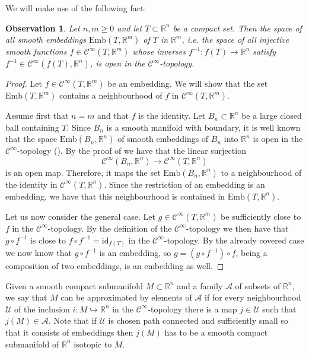 \documentclass{amsart}
\theoremstyle{plain}
\newtheorem{obs}[thm]{Observation}
\theoremstyle{definition}
\theoremstyle{remark}
\numberwithin{equation}{thm} %
\newcommand{\R}{\mathbb{R}}
\newcommand{\id}{\mathrm{id}}
\newcommand{\Emb}{\mathrm{Emb}}
\begin{document}
We will make use of the following fact:
\begin{obs}
Let $n,m\geq 0$ and let $T\subset \R^n$ be a compact set. Then the space of all smooth embeddings $\Emb(T,\R^m)$ of $T$ in $\R^m$, i.e. the space of all injective smooth functions $f\in \mathcal C^\infty(T,\R^m)$ whose inverses $f^{-1}:f(T)\rightarrow \R^n$ satisfy $f^{-1}\in \mathcal C^\infty(f(T),\R^n)$, is open in the $\mathcal C^\infty$-topology.
\end{obs}
\begin{proof}
Let $f\in \mathcal C^\infty(T,\R^m)$ be an embedding. We will show that the set $\Emb(T,\R^m)$ contains a neighbourhood of $f$ in $\mathcal C^\infty(T,\R^m)$.

Assume first that $n=m$ and that $f$ is the identity. Let $B_n\subset \R^n$ be a large closed ball containing $T$. Since $B_n$ is a smooth manifold with boundary, it is well known that the space $\Emb(B_n,\R^n)$ of smooth embeddings of $B_n$ into $\R^n$ is open in the $\mathcal C^\infty$-topology (\cite[p. 37, Theorem 1.4]{hirschDifferentialTopology1976}). By the proof of \cite[Claim 2.3]{bilskiApproximationPiecewiseregularMaps2020} we have that the linear surjection
\begin{equation*}
    \mathcal C^\infty(B_n,\R^n)\rightarrow \mathcal C^\infty(T,\R^n)
\end{equation*}
is an open map. Therefore, it maps the set $\Emb(B_n,\R^n)$ to a neighbourhood of the identity in $\mathcal C^\infty(T,\R^n)$. Since the restriction of an embedding is an embedding, we have that this neighbourhood is contained in $\Emb(T,\R^n)$.

Let us now consider the general case. Let $g\in \mathcal C^\infty(T,\R^m)$ be sufficiently close to $f$ in the $\mathcal C^\infty$-topology. By the definition of the $\mathcal C^\infty$-topology we then have that $g\circ f^{-1}$ is close to $f\circ f^{-1}=\id_{f(T)}$ in the $\mathcal C^\infty$-topology. By the already covered case we now know that $g\circ f^{-1}$ is an embedding, so $g=(g\circ f^{-1})\circ f$, being a composition of two embeddings, is an embedding as well.
\end{proof}



Given a smooth compact submanifold $M\subset \R^n$ and a family $\mathcal A$ of subsets of $\R^n$, we say that $M$ can be approximated by elements of $\mathcal A$ if for every neighbourhood $\mathcal U$ of the inclusion $i:M\hookrightarrow \R^n$ in the $\mathcal C^{\infty}$-topology there is a map $j\in \mathcal U$ such that $j(M)\in \mathcal A$. Note that if $\mathcal U$ is chosen path connected and sufficiently small so that it consists of embeddings then $j(M)$ has to be a smooth compact submanifold of $\R^n$ isotopic to $M$. 
\end{document}
